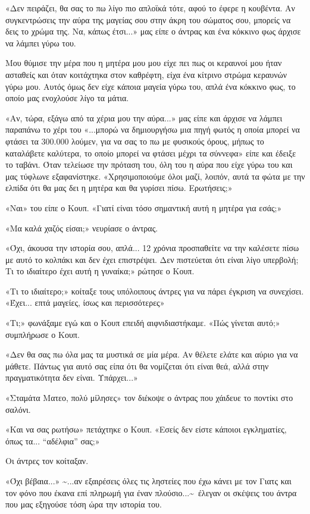 \documentclass[12pt,twoside, openany]{book}
\begin{document}
«Δεν πειράζει, θα σας το πω λίγο πιο απλοϊκά τότε, αφού το έφερε η κουβέντα. Αν συγκεντρώσεις την αύρα της μαγείας σου στην άκρη του σώματος σου, μπορείς να δεις το χρώμα της. Να, κάπως έτσι...» μας είπε ο άντρας και ένα κόκκινο φως άρχισε να λάμπει γύρω του.

Μου θύμισε την μέρα που η μητέρα μου μου είχε πει πως οι κεραυνοί μου ήταν ασταθείς και όταν κοιτάχτηκα στον καθρέφτη, είχα ένα κίτρινο στρώμα κεραυνών γύρω μου. Αυτός όμως δεν είχε κάποια μαγεία γύρω του, απλά ένα κόκκινο φως, το οποίο μας ενοχλούσε λίγο τα μάτια.

«Αν, τώρα, εξάγω από τα χέρια μου την αύρα...» μας είπε και άρχισε να λάμπει παραπάνω το χέρι του «...μπορώ να δημιουργήσω μια πηγή φωτός η οποία μπορεί να φτάσει τα 300.000 λούμεν, για να σας το πω με φυσικούς όρους, μήπως το καταλάβετε καλύτερα, το οποίο μπορεί να φτάσει μέχρι τα σύννεφα» είπε και έδειξε το ταβάνι. Όταν τελείωσε την πρόταση του, όλη του η αύρα που είχε γύρω του και μας τύφλωνε εξαφανίστηκε. «Χρησιμοποιούμε όλοι μαζί, λοιπόν, αυτά τα φώτα με την ελπίδα ότι θα μας δει η μητέρα και θα γυρίσει πίσω. Ερωτήσεις;»

«Ναι» του είπε ο Κουπ. «Γιατί είναι τόσο σημαντική αυτή η μητέρα για εσάς;»

«Μα καλά χαζός είσαι;» νευρίασε ο άντρας.

«Όχι, άκουσα την ιστορία σου, απλά... 12 χρόνια προσπαθείτε να την καλέσετε πίσω με αυτό το κολπάκι και δεν έχει επιστρέψει. Δεν πιστεύεται ότι είναι λίγο υπερβολή; Τι το ιδιαίτερο έχει αυτή η γυναίκα;» ρώτησε ο Κουπ.

«Τι το ιδιαίτερο;» κοίταξε τους υπόλοιπους άντρες για να πάρει έγκριση να συνεχίσει. «Έχει... επτά μαγείες, ίσως και περισσότερες»

«Τι;» φωνάξαμε εγώ και ο Κουπ επειδή αιφνιδιαστήκαμε. «Πώς γίνεται αυτό;» συμπλήρωσε ο Κουπ.

«Δεν θα σας πω όλα μας τα μυστικά σε μία μέρα. Αν θέλετε ελάτε και αύριο για να μάθετε. Πάντως για αυτό σας είπα ότι θα νομίζεται ότι είναι θεά, αλλά στην πραγματικότητα δεν είναι. Υπάρχει...»

«Σταμάτα Ματεο, πολύ μίλησες» τον διέκοψε ο άντρας που χάιδευε το ποντίκι στο σαλόνι.

«Και να σας ρωτήσω» πετάχτηκε ο Κουπ. «Εσείς δεν είστε κάποιοι εγκληματίες, όπως τα... “αδέλφια” σας;»

Οι άντρες τον κοίταξαν.

«Όχι βέβαια...» \textasciitilde ...αν εξαιρέσεις όλες τις ληστείες που έχω κάνει με τον Γιατς και τον φόνο που έκανα επί πληρωμή για έναν πλούσιο...\textasciitilde \  έλεγαν οι σκέψεις του άντρα που μας εξηγούσε τόση ώρα την ιστορία του.
\end{document}
